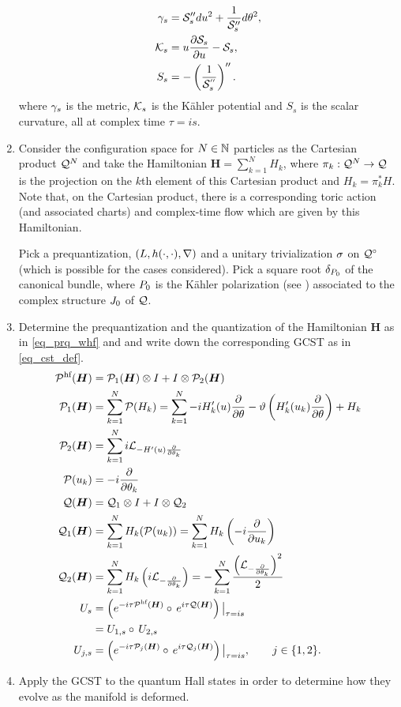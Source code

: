 \documentclass[notas.tex]{subfiles}
\begin{document}
\begin{enumerate}
	\begin{align*}
		\gamma_s &= \mathcal{S}_s'' du^2 + \frac{1}{\mathcal{S}_s''} d \theta^2, \\
		\mathcal{K}_s &= u\frac{\partial \mathcal{S}_s}{\partial u} - \mathcal{S}_s,  \\
		S_s &= - \left ( \frac{1}{\mathcal{S}_s^{''}} \right )''.
	\end{align*}
	where $\gamma_s$ is the metric, $\mathcal{K}_s$ is the Kähler potential and $S_s$ is the scalar curvature, all at complex time $\tau=is$.
	\item Consider the configuration space for $N \in \mathbb{N}$ particles as the Cartesian product $\mathcal{Q}^N$ and take the Hamiltonian $\bm{H} = \sum_{k=1}^{N} H_k$, where $\pi_k: \mathcal{Q}^N \to \mathcal{Q}$ is the projection on the $k$th element of this Cartesian product and $H_k = \pi_k^*H$. Note that, on the Cartesian product, there is a corresponding toric action (and associated charts) and complex-time flow which are given by this Hamiltonian.
	
	Pick a prequantization, $(L, h(\cdot,\cdot), \nabla)$ and a unitary trivialization $\sigma$ on $\nfld^\circ$ (which is possible for the cases considered). Pick a square root $\delta_{P_0}$ of the canonical bundle, where $P_0$ is the Kähler polarization (see ) associated to the complex structure $J_0$ of $\mathcal{Q}$. 
	\item \label{intro_operator_notation} Determine the prequantization and the quantization of the Hamiltonian $\bm{H}$ as in \eqref{eq_prq_whf} and  and write down the corresponding GCST as in \eqref{eq_cst_def}.
	\begin{align*}
		\prqhf{\bm{H}} &=  \prqs_1(\bm{H}) \otimes I +  I \otimes \prqs_2(\bm{H}) \\
		\prqs_{1}(\bm{H}) &= \sum_{k=1}^{N} \prq{H_k} = \sum_{k=1}^{N} - i  H_k'(u) \pd{\theta} - \spot \left( H_k'(u_k) \pd{\theta} \right) + H_k \\
		\prqs_{2}(\bm{H}) &= \sum_{k=1}^{N} i \lied{- H'(u) \pd{\theta_k}} \\
		\prq{u_k} &= - i  \pd{\theta_k} \\
		\q{\bm{H}} &=  \qs_1 \otimes I +  I \otimes \qs_2 \\
		\qs_1(\bm{H}) &= \sum_{k=1}^{N} H_k(\prq{u_k}) = \sum_{k=1}^{N} H_k \left (- i  \pd{u_k} \right )  \\
		\qs_2(\bm{H}) &= \sum_{k=1}^{N} H_k \left (i\lied{-\pd{\theta_k}} \right ) = - \sum_{k=1}^{N} \frac{\left( \lied{-\pd{\theta_k}}\right)^2}{2}  \\
		U_s &= \left ( e^{-i \tau \prqhf{\bm{H}}} \circ e^{i \tau \q{\bm{H}}} \right )\big|_{\tau = is} \\
		&= U_{1,s} \circ U_{2,s} \\
		U_{j,s} &= \left ( e^{-i \tau \prqs_j(\bm{H})} \circ e^{i \tau \qs_j(\bm{H})} \right )\big|_{\tau = is}, \qquad j \in \{1,2\}.
	\end{align*}
	\item Apply the GCST to the quantum Hall states in order to determine how they evolve as the manifold is deformed.
\end{enumerate}
\end{document}
